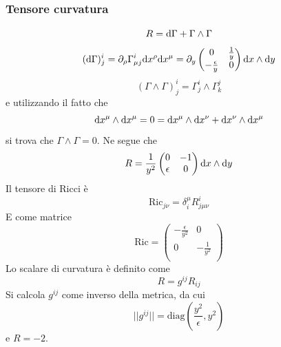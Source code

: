 \subsubsection*{Tensore curvatura}
\[ R = \mathrm{d}\Gamma + \Gamma\wedge\Gamma \]
\begin{equation}
	(\mathrm{d}\Gamma)^i_j = \partial_\rho \Gamma_{\mu j}^i \mathrm{d} x^\rho \mathrm{d} x^\mu = \partial_y 
		\begin{pmatrix}
			0 & \frac{1}{y} \\
			-\frac{\epsilon}{y} & 0 \\
		\end{pmatrix}
		\mathrm{d} x\wedge\mathrm{d} y
\end{equation}
\[ (\Gamma\wedge\Gamma)^i_j = \Gamma^i_j\wedge\Gamma^j_k \]
e utilizzando il fatto che 
\[ \mathrm{d} x^\mu\wedge\mathrm{d} x^\mu = 0 = \mathrm{d} x^\mu\wedge\mathrm{d} x^\nu + \mathrm{d} x^\nu\wedge\mathrm{d} x^\mu \]
si trova che \( \Gamma\wedge\Gamma = 0 \).
Ne segue che 
\[ R = \frac{1}{y^2} 
	\begin{pmatrix}
		0 & -1 \\
		\epsilon & 0 \\
	\end{pmatrix}
	\mathrm{d} x\wedge\mathrm{d} y
\]
Il tensore di Ricci \`e 
\[ \mathrm{Ric}_{j\nu} = \delta^\mu_i R^i_{j\mu\nu} \]
E come matrice
\[ \mathrm{Ric} = 
	\begin{pmatrix}
		-\frac{\epsilon}{y^2} & 0 \\
		0                     & -\frac{1}{y^2} \\
	\end{pmatrix}
\]
Lo scalare di curvatura \`e definito come 
\[ R = g^{ij} R_{ij} \]
Si calcola $g^{ij}$ come inverso della metrica, da cui
\[ ||g^{ij}|| = \mathrm{diag}(\frac{y^2}{\epsilon}, y^2) \]
e $R=-2$.

